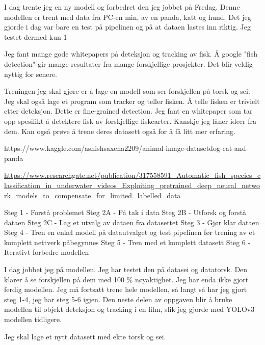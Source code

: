 I dag trente jeg en ny modell og forbedret den jeg jobbet på Fredag. Denne modellen er trent med data fra PC-en min, av en panda, katt og hund. Det jeg gjorde i dag var bare en test på pipelinen og på at dataen lastes inn riktig. Jeg testet dermed kun 1 %

Jeg fant mange gode whitepapers på deteksjon og tracking av fisk. Å google "fish detection" gir mange resultater fra mange forskjellige prosjekter. Det blir veldig nyttig for senere.

Treningen jeg skal gjøre er å lage en modell som ser forskjellen på torsk og sei. Jeg skal også lage et program som tracker og teller fisken. Å telle fisken er trivielt etter deteksjon. Dette er fine-grained detection. Jeg fant en whitepaper som tar opp spesifikt å detektere fisk av forskjellige fiskearter. Kanskje jeg låner ideer fra dem. Kan også prøve å trene deres datasett også for å få litt mer erfaring.

https://www.kaggle.com/ashishsaxena2209/animal-image-datasetdog-cat-and-panda

\url{https://www.researchgate.net/publication/317558591_Automatic_fish_species_classification_in_underwater_videos_Exploiting_pretrained_deep_neural_network_models_to_compensate_for_limited_labelled_data}

Steg 1 - Forstå problemet
Steg 2A - Få tak i data
Steg 2B - Utforsk og forstå dataen
Steg 2C - Lag et utvalg av dataen fra datasettet
Steg 3 - Gjør klar dataen
Steg 4 - Tren en enkel modell på datautvalget og test pipelinen før trening av et komplett nettverk påbegynnes
Steg 5 - Tren med et komplett datasett
Steg 6 - Iterativt forbedre modellen

I dag jobbet jeg på modellen. Jeg har testet den på datasei og datatorsk. Den klarer å se forskjellen på dem med 100 \% nøyaktighet. Jeg har enda ikke gjort ferdig modellen. Jeg må fortsatt trene hele modellen, så langt så har jeg gjort steg 1-4, jeg har steg 5-6 igjen. Den neste delen av oppgaven blir å bruke modellen til objekt deteksjon og tracking i en film, slik jeg gjorde med YOLOv3 modellen tidligere.

Jeg skal lage et nytt datasett med ekte torsk og sei.

